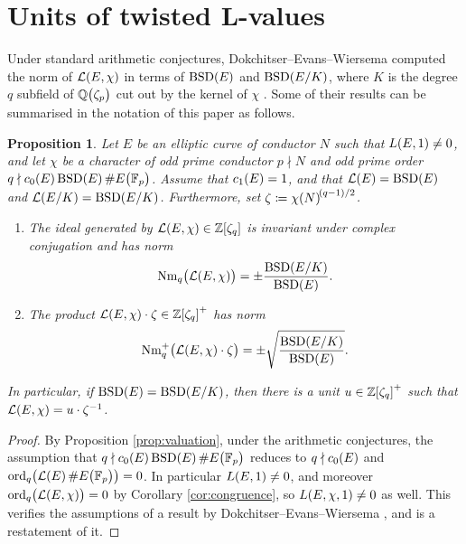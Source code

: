 \documentclass{article}
\theoremstyle{plain}
\newtheorem{proposition}[n]{Proposition}
\theoremstyle{definition}
\newcommand{\BSD}{\operatorname{BSD}}
\newcommand{\FF}{\mathbb{F}}
\newcommand{\LLL}{\mathcal{L}}
\newcommand{\Nm}{\operatorname{Nm}}
\newcommand{\ord}{\operatorname{ord}}
\newcommand{\QQ}{\mathbb{Q}}
\newcommand{\ZZ}{\mathbb{Z}}
\newcommand{\br}{\!\del}
\begin{document}
\pagebreak

\section{Units of twisted L-values}

\label{sec:unit}

Under standard arithmetic conjectures, Dokchitser--Evans--Wiersema computed the norm of $ \LLL\br{E, \chi} $ in terms of $ \BSD\br{E} $ and $ \BSD\br[0]{E / K} $, where $ K $ is the degree $ q $ subfield of $ \QQ\br{\zeta_p} $ cut out by the kernel of $ \chi $ \cite[Theorem 38]{DEW21}. Some of their results can be summarised in the notation of this paper as follows.

\begin{proposition}
\label{prop:bsd}
Let $ E $ be an elliptic curve of conductor $ N $ such that $ L\br{E, 1} \ne 0 $, and let $ \chi $ be a character of odd prime conductor $ p \nmid N $ and odd prime order $ q \nmid c_0\br{E}\BSD\br{E}\#E\br{\FF_p} $. Assume that $ c_1\br{E} = 1 $, and that $ \LLL\br{E} = \BSD\br{E} $ and $ \LLL\br[0]{E / K} = \BSD\br[0]{E / K} $. Furthermore, set $ \zeta \coloneqq \chi\br{N}^{\br{q - 1} / 2} $.
\begin{enumerate}
\item The ideal generated by $ \LLL\br{E, \chi} \in \ZZ\sbr[0]{\zeta_q} $ is invariant under complex conjugation and has norm
$$ \Nm_q\br{\LLL\br{E, \chi}} = \pm\dfrac{\BSD\br[0]{E / K}}{\BSD\br{E}}. $$
\item The product $ \LLL\br{E, \chi} \cdot \zeta \in \ZZ\sbr[0]{\zeta_q}^+ $ has norm
$$ \Nm_q^+\br{\LLL\br{E, \chi} \cdot \zeta} = \pm\sqrt{\dfrac{\BSD\br[0]{E / K}}{\BSD\br{E}}}. $$
\end{enumerate}
In particular, if $ \BSD\br{E} = \BSD\br[0]{E / K} $, then there is a unit $ u \in \ZZ\sbr[0]{\zeta_q}^+ $ such that $ \LLL\br{E, \chi} = u \cdot \zeta^{-1} $.
\end{proposition}

\begin{proof}
By Proposition \ref{prop:valuation}, under the arithmetic conjectures, the assumption that $ q \nmid c_0\br{E}\BSD\br{E}\#E\br{\FF_p} $ reduces to $ q \nmid c_0\br{E} $ and $ \ord_q\br[1]{\LLL\br{E}\#E\br{\FF_p}} = 0 $. In particular $ L\br{E, 1} \ne 0 $, and moreover $ \ord_q\br{\LLL\br{E, \chi}} = 0 $ by Corollary \ref{cor:congruence}, so $ L\br{E, \chi, 1} \ne 0 $ as well. This verifies the assumptions of a result by Dokchitser--Evans--Wiersema \cite[Theorem 13(5) to Theorem 13(12)]{DEW21}, and is a restatement of it.
\end{proof}
\end{document}
